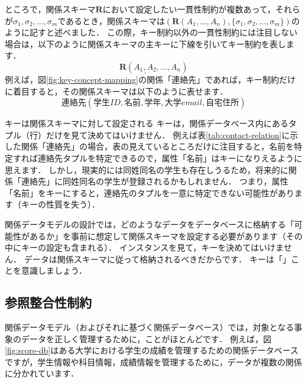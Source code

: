 ところで，関係スキーマ$\boldsymbol{R}$において設定したい一貫性制約が複数あって，それらが$\sigma_1, \sigma_2, ..., \sigma_m$であるとき，関係スキーマは$(\boldsymbol{R}(A_1, ..., A_n), \{\sigma_1, \sigma_2, ..., \sigma_m\})$のように記すと述べました．
この際，キー制約以外の一貫性制約には注目しない場合は，以下のように関係スキーマの主キーに下線を引いてキー制約を表します．
\begin{equation}
\boldsymbol{R}(\underline{A_1, A_2}, ..., A_n)
\end{equation}
例えば，図\ref{fig:key-concept-mapping}の関係「連絡先」であれば，キー制約だけに着目すると，その関係スキーマは以下のように表せます．
\begin{equation}
\textbf{連絡先}(\underline{学生ID}, 名前, 学年, 大学email, 自宅住所)
\end{equation}

\begin{notebox}{キーは関係スキーマに対して設定される}
キーは，関係データベース内にあるタプル（行）だけを見て決めてはいけません．
例えば表\ref{tab:contact-relation}に示した関係「連絡先」の場合，表の見えているところだけに注目すると，名前を特定すれば連絡先タプルを特定できるので，属性「名前」はキーになりえるように思えます．
しかし，現実的には同姓同名の学生も存在しうるため，将来的に関係「連絡先」に同姓同名の学生が登録されるかもしれません．
つまり，属性「名前」をキーにすると，連絡先のタプルを一意に特定できない可能性があります（キーの性質を失う）．

関係データモデルの設計では，どのようなデータをデータベースに格納する「可能性があるか」を事前に想定して関係スキーマを設定する必要があります（その中にキーの設定も含まれる）．
インスタンスを見て，キーを決めてはいけません．
データは関係スキーマに従って格納されるべきだからです．
キーは「」ことを意識しましょう．
\end{notebox}


\subsection{参照整合性制約}
関係データモデル（およびそれに基づく関係データベース）では，対象となる事象のデータを正しく管理するために，ことがほとんどです．
例えば，図\ref{fig:score-db}はある大学における学生の成績を管理するための関係データベースですが，学生情報や科目情報，成績情報を管理するために，データが複数の関係に分かれています．

